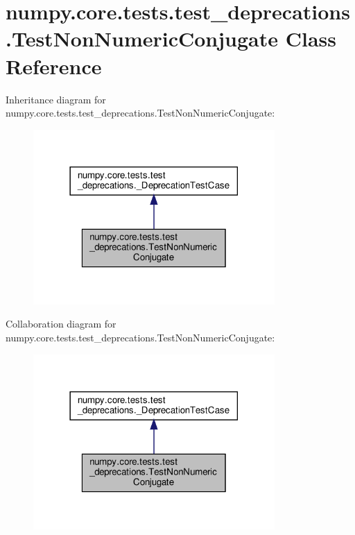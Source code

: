 \hypertarget{classnumpy_1_1core_1_1tests_1_1test__deprecations_1_1TestNonNumericConjugate}{}\section{numpy.\+core.\+tests.\+test\+\_\+deprecations.\+Test\+Non\+Numeric\+Conjugate Class Reference}
\label{classnumpy_1_1core_1_1tests_1_1test__deprecations_1_1TestNonNumericConjugate}


Inheritance diagram for numpy.\+core.\+tests.\+test\+\_\+deprecations.\+Test\+Non\+Numeric\+Conjugate\+:
\nopagebreak
\begin{figure}[H]
\begin{center}
\leavevmode
\includegraphics[width=261pt]{classnumpy_1_1core_1_1tests_1_1test__deprecations_1_1TestNonNumericConjugate__inherit__graph}
\end{center}
\end{figure}


Collaboration diagram for numpy.\+core.\+tests.\+test\+\_\+deprecations.\+Test\+Non\+Numeric\+Conjugate\+:
\nopagebreak
\begin{figure}[H]
\begin{center}
\leavevmode
\includegraphics[width=261pt]{classnumpy_1_1core_1_1tests_1_1test__deprecations_1_1TestNonNumericConjugate__coll__graph}
\end{center}
\end{figure}
